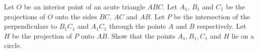 Let $O$ be an interior point of an acute triangle $ABC$. Let $A_1$, $B_1$ and $C_1$ be the
projections of $O$ onto the sides $BC$, $AC$ and $AB$. Let $P$ be the intersection of the
perpendiculars to $B_1C_1$ and $A_1C_1$ through the points $A$ and $B$ respectively.
Let $H$ be the projection of $P$ onto $AB$.
Show that the points $A_1,B_1, C_1$ and $H$ lie on a circle.
